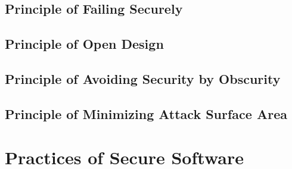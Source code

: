 \documentclass{csse4400}
\begin{document}
\subsection{Principle of Failing Securely}
\subsection{Principle of Open Design}
\subsection{Principle of Avoiding Security by Obscurity}
\subsection{Principle of Minimizing Attack Surface Area}


\section{Practices of Secure Software}
\end{document}
